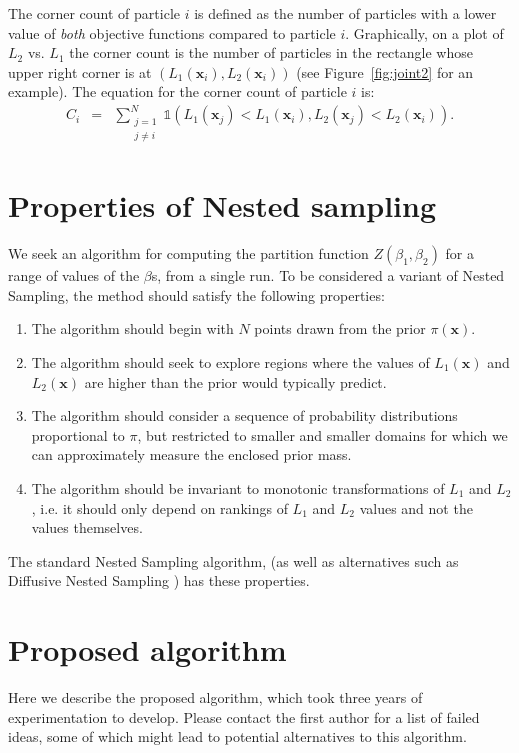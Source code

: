 \documentclass[journal,article,accept,moreauthors,pdftex,12pt,a4paper]{mdpi}
\newcommand{\xx}{\boldsymbol{x}}
\begin{document}
The corner count of particle $i$ is defined as the number of particles with
a lower value of {\em both} objective functions compared to particle $i$.
Graphically, on a plot of $L_2$ vs. $L_1$ the corner count is the number of
particles in the rectangle whose upper right corner is at
$\left(L_1(\xx_i), L_2(\xx_i)\right)$ (see Figure~\ref{fig:joint2} for an
example). The equation for the corner count of particle $i$ is:
\begin{eqnarray}
C_i &=& \sum_{\substack{j=1\\{j \neq i}}}^N \mathds{1}\left(L_1(\xx_j) < L_1(\xx_i),
L_2(\xx_j) < L_2(\xx_i)
\right).\label{eqn:corner_count}
\end{eqnarray}


\section{Properties of Nested sampling}

We seek an algorithm for computing the partition function
$Z(\beta_1, \beta_2)$ for a range of values of the $\beta$s, from a single
run. To be considered a variant of Nested Sampling, the method should satisfy
the following properties:
\begin{enumerate}
\item The algorithm should begin with $N$ points drawn from the prior $\pi(\xx)$.
\item The algorithm should seek to explore regions where the values of
$L_1(\xx)$ and $L_2(\xx)$ are higher than the prior would typically predict.
\item The algorithm should consider a sequence of probability
distributions proportional to $\pi$, but restricted to smaller and smaller
domains for which we can approximately measure the enclosed prior mass.
\item The algorithm should be invariant to monotonic transformations of
$L_1$ and $L_2$, i.e. it should only depend on rankings of $L_1$ and $L_2$
values and not the values themselves.
\end{enumerate}
The standard Nested Sampling algorithm, (as well as alternatives such as
Diffusive Nested Sampling \citep{dnest}) has these properties.

\section{Proposed algorithm}\label{sec:algorithm}

Here we describe the proposed algorithm, which took three years of
experimentation to develop. Please contact the first author for a list of
failed ideas, some of which might lead to potential alternatives to this
algorithm. 
\end{document}
